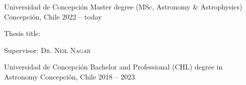 
\begin{cventries}

  \cventry
    {Universidad de Concepción}
    {Master degree (MSc, Astronomy \& Astrophysics)}
    {Concepción, Chile}
    {2022 -- today}
    {
      \begin{cvitems}
        \item{Thesis title: }
        \item{Supervisor: \textsc{Dr. Neil Nagar}}
      \end{cvitems}
      \vspace{1em}
    }
  \cventry
    {Universidad de Concepción}
    {Bachelor and Professional (CHL) degree in Astronomy}
    {Concepción, Chile}
    {2018 -- 2023}
    {}

\end{cventries}
